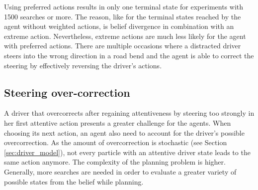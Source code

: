 Using preferred actions results in only one terminal state for experiments with 1500 searches or more. The reason, like for the terminal states reached by the agent without weighted actions, is belief divergence in combination with an extreme action. Nevertheless, extreme actions are much less likely for the agent with preferred actions. There are multiple occasions where a distracted driver steers into the wrong direction in a road bend and the agent is able to correct the steering by effectively reversing the driver's actions.




\subsection{Steering over-correction}


A driver that overcorrects after regaining attentiveness by steering too strongly in her first attentive action presents a greater challenge for the agents. When choosing its next action, an agent also need to account for the driver's possible overcorrection. As the amount of overcorrection is stochastic (see Section \ref{sec:driver_model}), not every particle with an attentive driver state leads to the same action anymore. The complexity of the planning problem is higher. Generally, more searches are needed in order to evaluate a greater variety of possible states from the belief while planning.

